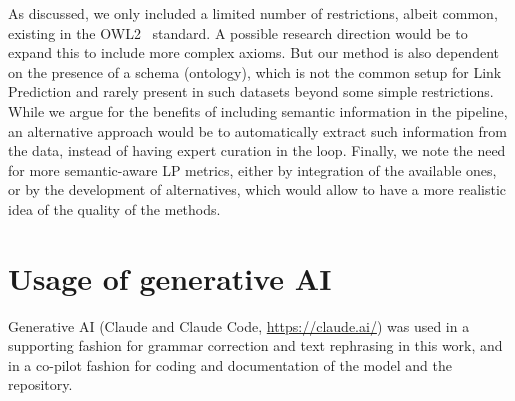\documentclass[a4paper,UKenglish,cleveref, autoref, thm-restate]{tgdk-v2021}
\begin{document}
As discussed, we only included a limited number of restrictions, albeit common, existing in the OWL2~\cite{motik_owl_2012} standard. A possible research direction would be to expand this to include more complex axioms. But our method is also dependent on the presence of a schema (ontology), which is not the common setup for Link Prediction and rarely present in such datasets beyond some simple restrictions. While we argue for the benefits of including semantic information in the pipeline, an alternative approach would be to automatically extract such information from the data, instead of having expert curation in the loop. Finally, we note the need for more semantic-aware LP metrics, either by integration of the available ones, or by the development of alternatives, which would allow to have a more realistic idea of the quality of the methods.





\appendix
\section*{Usage of generative AI}
Generative AI (Claude and Claude Code, \url{https://claude.ai/}) was used in a supporting fashion for grammar correction and text rephrasing in this work, and in a co-pilot fashion for coding and documentation of the model and the repository.
\end{document}
